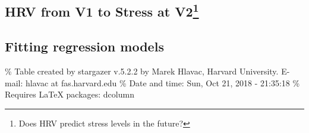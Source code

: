 \documentclass[10pt,]{tufte-handout}
\begin{document}
\hypertarget{hrv-from-v1-to-stress-at-v2}{%
\subsection[HRV from V1 to Stress at V2]{\texorpdfstring{HRV from V1 to
Stress at V2\footnote{Does HRV predict stress levels in the future?}}{HRV from V1 to Stress at V2}}\label{hrv-from-v1-to-stress-at-v2}}

\hypertarget{fitting-regression-models}{%
\subsection{Fitting regression models}\label{fitting-regression-models}}

\% Table created by stargazer v.5.2.2 by Marek Hlavac, Harvard
University. E-mail: hlavac at fas.harvard.edu \% Date and time: Sun, Oct
21, 2018 - 21:35:18 \% Requires LaTeX packages: dcolumn
\end{document}
